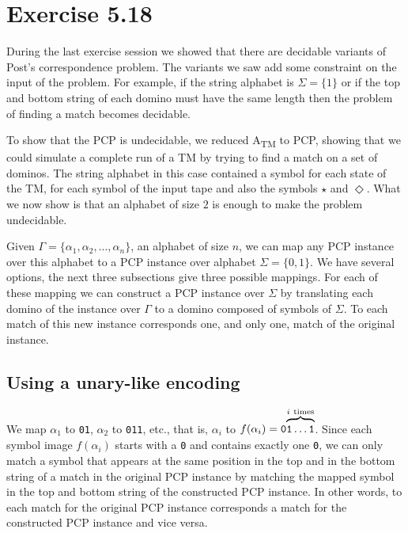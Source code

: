 \documentclass{article}
\newcommand{\TM}{TM}
\newcommand{\Atm}{A\textsubscript{TM}}
\begin{document}
\section{Exercise 5.18}
During the last exercise session we showed that there are decidable variants
of Post's correspondence problem. The variants we saw add some constraint on
the input of the problem. For example, if the string alphabet is \(\Sigma =
\{1\}\) or if the top and bottom string of each domino must have the same
length then the problem of finding a match becomes decidable.

To show that the PCP is undecidable, we reduced \Atm{} to PCP, showing that we
could simulate a complete run of a \TM{} by trying to find a match on a
set of dominos. The string alphabet in this case contained a symbol for each
state of the \TM{}, for each symbol of the input tape and also the symbols
\texttt{\(\star\)} and \texttt{\(\Diamond\)}.
What we now show is that an alphabet of size \(2\) is enough to make
the problem undecidable.

Given \(\Gamma = \{\alpha_1, \alpha_2, \ldots, \alpha_n\}\), an alphabet of size \(n\),
we can map any PCP instance over this alphabet to a PCP instance over alphabet
\(\Sigma = \{0,1\}\). We have several options, the next three subsections give
three possible mappings. For each of these mapping we can construct a PCP
instance over \(\Sigma\)
by translating each domino of the instance over \(\Gamma\) to a domino composed
of symbols of \(\Sigma\). To each match of this new instance corresponds one,
and only one, match of the original instance.

\subsection{Using a unary-like encoding}
We map \(\alpha_1\) to \texttt{01}, \(\alpha_2\) to \texttt{011}, etc., that
is, \(\alpha_i\) to
\(f(\alpha_i) =
\texttt{0}\mathrlap{\overbrace{\phantom{\texttt{1}\ldots
\texttt{1}\strut}}^{i~\text{times}}}\texttt{1}\ldots\texttt{1}\).
Since each symbol image \(f(\alpha_i)\) starts with a \texttt{0} and
contains exactly one \texttt{0},
we can only match a symbol that appears at the same position in the top
and in the bottom string of a match in the original PCP instance by matching
the mapped symbol in the top and bottom string of the constructed PCP instance.
In other words, to each match for the original PCP instance corresponds a match
for the constructed PCP instance and vice versa.
\end{document}
